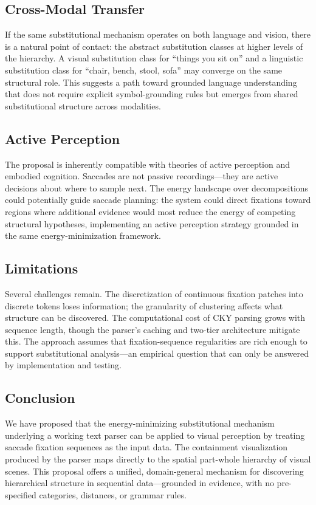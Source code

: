 \documentclass[11pt,a4paper]{article}
\begin{document}
\subsection{Cross-Modal Transfer}

If the same substitutional mechanism operates on both language and vision, there is a natural point of contact: the abstract substitution classes at higher levels of the hierarchy. A visual substitution class for ``things you sit on'' and a linguistic substitution class for ``chair, bench, stool, sofa'' may converge on the same structural role. This suggests a path toward grounded language understanding that does not require explicit symbol-grounding rules but emerges from shared substitutional structure across modalities.

\subsection{Active Perception}

The proposal is inherently compatible with theories of active perception and embodied cognition. Saccades are not passive recordings---they are active decisions about where to sample next. The energy landscape over decompositions could potentially guide saccade planning: the system could direct fixations toward regions where additional evidence would most reduce the energy of competing structural hypotheses, implementing an active perception strategy grounded in the same energy-minimization framework.

\subsection{Limitations}

Several challenges remain. The discretization of continuous fixation patches into discrete tokens loses information; the granularity of clustering affects what structure can be discovered. The computational cost of CKY parsing grows with sequence length, though the parser's caching and two-tier architecture mitigate this. The approach assumes that fixation-sequence regularities are rich enough to support substitutional analysis---an empirical question that can only be answered by implementation and testing.

\subsection{Conclusion}

We have proposed that the energy-minimizing substitutional mechanism underlying a working text parser can be applied to visual perception by treating saccade fixation sequences as the input data. The containment visualization produced by the parser maps directly to the spatial part-whole hierarchy of visual scenes. This proposal offers a unified, domain-general mechanism for discovering hierarchical structure in sequential data---grounded in evidence, with no pre-specified categories, distances, or grammar rules.
\end{document}
